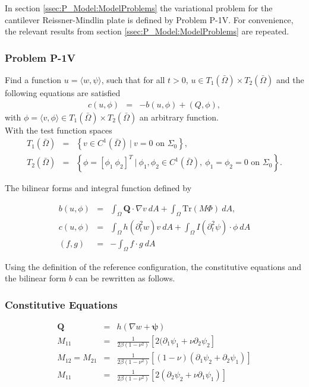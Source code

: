 \documentclass[../../main.tex]{subfiles}
\begin{document}
In section \ref{ssec:P_Model:ModelProblems} the variational problem for the cantilever Reissner-Mindlin plate is defined by Problem P-1V. For convenience, the relevant results from section \ref{ssec:P_Model:ModelProblems} are repeated.

\subsubsection{Problem P-1V}
Find a function $u = \langle w, \psi \rangle$, such that for all $t>0$, $u \in T_1({\bar{\Omega}}) \times T_2({\bar{\Omega}})$ and the following equations are satisfied
\begin{eqnarray}
	c(u,\phi) &=& -b(u,\phi) + (Q,\phi), \label{eq:P_Model:ProblemP1V1}
\end{eqnarray} with $\phi = \langle v, \phi \rangle  \in T_1({\bar{\Omega}}) \times T_2({\bar{\Omega}})$ an arbitrary function.\\

With the test function spaces
\begin{eqnarray*}
	T_1(\bar{\Omega}) & = & \left \{v \in C^1(\bar{\Omega})\ | \ v = 0 \textrm{ on } \Sigma_0\right\},\\ 
	T_2(\bar{\Omega}) & = & \left \{ \phi = \left[ \phi_1 \ \phi_2 \right]^T \ | \ \phi_1, \phi_2 \in C^1(\bar{\Omega}), \ \phi_1 = \phi_2 = 0 \textrm{ on } \Sigma_0 \right\}.
\end{eqnarray*}

The bilinear forms and integral function defined by

\begin{eqnarray*}
	b(u,\phi) & = & \int_\Omega \boldsymbol{Q} \cdot \nabla v \ dA + \int_{\Omega} \textrm{Tr}(M\Phi) \ dA,\\
	c(u,\phi) & = & \int_\Omega h (\partial_t^2 w) v \ dA + \int_\Omega I (\partial_t^2 \psi) \cdot \phi \ dA \\
	(f,g) &=& -\int_{\Omega} f\cdot g \ dA \label{eq:2D_Model:Bilinear_int}
\end{eqnarray*}

Using the definition of the reference configuration, the constitutive equations and the bilinear form $b$ can be rewritten as follows.

\subsubsection{Constitutive Equations}
\begin{eqnarray}
	\boldsymbol{Q} & = & h(\nabla w + \boldsymbol{\psi}) \label{eq:P_Model:CE1D}\\
	M_{11} & = & \frac{1}{2\beta(1-\nu^2)} \left[ 2(\partial_1\psi_1 + \nu \partial_2 \psi_2 \right] \label{eq:P_Model:CE2D}\\
	M_{12} = M_{21} & = & \frac{1}{2\beta(1-\nu^2)} \left[ (1-\nu)(\partial_1\psi_2 + \partial_2 \psi_1) \right] \label{eq:P_Model:CE3D}\\
	M_{11} & = & \frac{1}{2\beta(1-\nu^2)} \left[ 2(\partial_2 \psi_2 + \nu \partial_1 \psi_1)\right] \label{eq:P_Model:CE4D}
\end{eqnarray}
\end{document}
